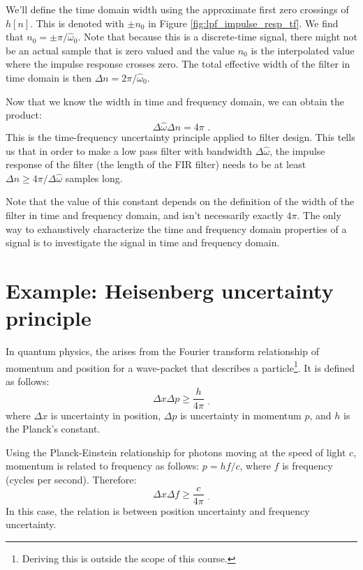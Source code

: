 We'll define the time domain width using the approximate first zero
crossings of $h[n]$. This is denoted with $\pm n_0$ in
Figure \ref{fig:lpf_impulse_resp_tf}. We find that $n_0
  = \pm \pi/\hat{\omega}_0$. Note that because this is a discrete-time
signal, there might not be an actual sample that is zero valued and
the value $n_0$ is the interpolated value where the impulse
response crosses zero. The total effective width of the filter in time
domain is then $\Delta n = 2\pi/\hat{\omega}_0$.

Now that we know the width in time and frequency domain, we can obtain
the product:
\begin{equation}
  \Delta\hat{\omega}\Delta n = 4\pi \,\,.
\end{equation}
This is the time-frequency uncertainty principle applied to filter
design. This tells us that in order to make a low pass filter with
bandwidth $\Delta \hat{\omega}$, the impulse response of the filter
(the length of the FIR filter) needs to be at least $\Delta n \ge
  4\pi/\Delta \hat{\omega}$ samples long.

Note that the value of this constant depends on the definition of the
width of the filter in time and frequency domain, and isn't
necessarily exactly $4\pi$. The only way to exhaustively characterize
the time and frequency domain properties of a signal is to investigate
the signal in time and frequency domain.




  \section{Example: Heisenberg uncertainty principle}

  In quantum physics, the \emph{} arises from the Fourier
  transform relationship of momentum and position for a wave-packet that
  describes a particle\footnote{Deriving this is outside the scope of
    this course.}. It is defined as follows:
  \begin{equation}
    \Delta x \Delta p \ge \frac{h}{4\pi} \,\, _,
    \label{eq:pos_mom}
  \end{equation}
  where $\Delta x$ is uncertainty in position, $\Delta p$ is uncertainty
  in momentum $p$, and $h$ is the Planck's constant.

  Using the Planck-Einstein relationship for photons moving at the speed
  of light $c$, momentum is related to frequency as follows: $p=hf/c$,
  where $f$ is frequency (cycles per second). Therefore:
  \begin{equation}
    \Delta x \Delta f \ge \frac{c}{4\pi} \,\, _.
  \end{equation}
  In this case, the relation is between position uncertainty and
  frequency uncertainty.

\fi
